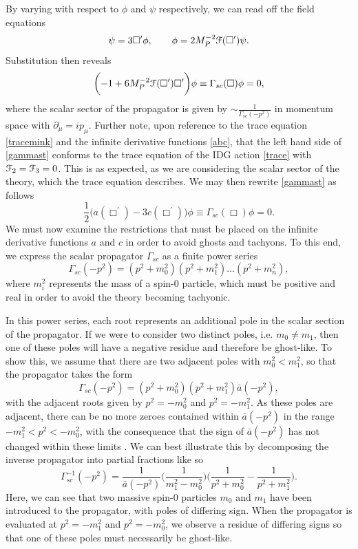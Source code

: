 By varying with respect to $\phi$ and $\psi$ respectively, we can read off the field equations
\[
\psi=3\Box^\prime \phi
,\qquad
\phi=2M_P^{-2}{\cal F}(\Box^\prime)\psi.
\] 
Substitution then reveals
\[
\label{gammast}
\biggl(-1+6M_P^{-2}{\cal F}(\Box^\prime)\Box^\prime\biggr) \phi\equiv \Gamma_{sc}(\Box)\phi=0,
\]
where the scalar sector of the propagator is given by $\sim \frac{1}{\Gamma_{sc}(-p^2)}$ in momentum space with $\partial_\mu=ip_\mu$. Further note, upon reference to the trace equation \eqref{tracemink} and the  infinite derivative functions \eqref{abc}, that the left hand side of \eqref{gammast} conforms to the trace equation of the IDG action \eqref{trace} with ${\cal F}_2={\cal F}_3=0$. This is as expected, as we are considering the scalar sector of the theory, which the trace equation describes. We may then rewrite \eqref{gammast} as follows
\[
\label{a-3cst}
\frac{1}{2}\biggl(a(\Box^{\prime})-3c(\Box^{\prime})\biggr)\phi\equiv\Gamma_{sc}(\Box)\phi=0
 .\]
We must now examine the restrictions that must be placed on the infinite derivative functions $a$ and $c$ in order to avoid ghosts and tachyons. To this end, we express the scalar propagator $\Gamma_{sc}$ as a finite power series
 \[
 \Gamma_{sc}(-p^2)=(p^2+m^2_0)(p^2+m^2_1)\dots(p^2+m^2_n),
\]
where $m_i^2$ represents the mass of a spin-0 particle, which must be positive and real in order to avoid the theory becoming tachyonic. 

In this power series, each root represents an additional pole in the scalar section of the propagator. If we were to consider two distinct poles, i.e. $m_0\neq m_1$, then one of these poles will have a negative residue and  therefore be ghost-like. To show this, we assume that there are two adjacent poles with $m_0^2<m_1^2$, so that the propagator takes the form
\[
\Gamma_{sc}(-p^2)=(p^2+m_0^2)(p^2+m_1^2){\bar a}(-p^2),
\]
with the adjacent roots given by $p^2=-m_0^2$ and $p^2=-m_1^2$. As these poles are adjacent, there can be no more zeroes contained within ${\bar a}(-p^2)$  in the range $-m_1^2<p^2<-m_0^2$, with the consequence that the sign of ${\bar a}(-p^2)$ has not changed within these limits \cite{Biswas:2005qr}. 
 We can best illustrate this by decomposing the inverse propagator into partial fractions like so
\[
\Gamma_{sc}^{-1}(-p^2)=\frac{1}{{\bar a}(-p^2)}\biggl(\frac{1}{m_1^2-m_0^2}\biggr)\biggl(\frac{1}{p^2+m_0^2}-\frac{1}{p^2+m_1^2}\biggr)
.\] 
Here, we can see that two massive spin-0 particles $m_0$ and $m_1$ have been introduced to the propagator, with poles of differing sign. When the propagator is evaluated at $p^2=-m_1^2$ and $p^2=-m_0^2$, we observe a residue of differing signs so that one of these poles must necessarily be ghost-like.

